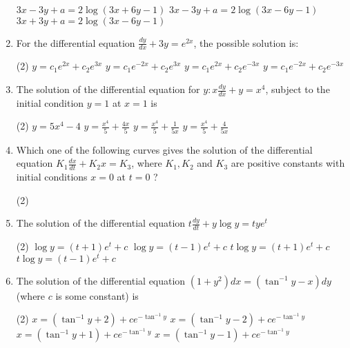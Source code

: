 \begin{enumerate}
\begin{tasks}
		\task[\textbf{b.}] $3 x-3 y+a=2 \log (3 x+6 y-1)$
		\task[\textbf{c.}]$3 x-3 y+a=2 \log (3 x-6 y-1)$
		\task[\textbf{d.}] $3 x+3 y+a=2 \log (3 x-6 y-1)$
	\end{tasks}
	\item For the differential equation $\frac{d y}{d x}+3 y=e^{2 x}$, the possible solution is:
	 \begin{tasks}(2)
		\task[\textbf{a.}]$y=c_{1} e^{2 x}+c_{2} e^{3 x}$
		\task[\textbf{b.}]$y=c_{1} e^{-2 x}+c_{2} e^{3 x}$
		\task[\textbf{c.}]$y=c_{1} e^{2 x}+c_{2} e^{-3 x}$
		\task[\textbf{d.}] $y=c_{1} e^{-2 x}+c_{2} e^{-3 x}$
	\end{tasks}
	\item The solution of the differential equation for $y: x \frac{d y}{d x}+y=x^{4}$, subject to the initial condition $y=1$ at $x=1$ is
	 \begin{tasks}(2)
		\task[\textbf{a.}]$y=5 x^{4}-4$
		\task[\textbf{b.}]$y=\frac{x^{4}}{5}+\frac{4 x}{5}$
		\task[\textbf{c.}] $y=\frac{x^{4}}{5}+\frac{1}{5 x}$
		\task[\textbf{d.}] $y=\frac{x^{4}}{5}+\frac{4}{5 x}$
	\end{tasks}
	\item Which one of the following curves gives the solution of the differential equation $K_{1} \frac{d x}{d t}+K_{2} x=K_{3}$, where $K_{1}, K_{2}$ and $K_{3}$ are positive constants with initial conditions $x=0$ at $t=0$ ?
	 \begin{tasks}(2)
		\task[\textbf{a.}]\color{blue}{Picture}
		\task[\textbf{b.}]\color{blue}{Picture}
		\task[\textbf{c.}]\color{blue}{Picture}
		\task[\textbf{d.}] \color{blue}{Picture}
	\end{tasks}
	\item The solution of the differential equation $t \frac{d y}{d t}+y \log y=t y e^{t}$
	 \begin{tasks}(2)
		\task[\textbf{a.}]$\log y=(t+1) e^{t}+c$
		\task[\textbf{b.}]$\log y=(t-1) e^{t}+c$
		\task[\textbf{c.}]$t \log y=(t+1) e^{t}+c$
		\task[\textbf{d.}] $t \log y=(t-1) e^{t}+c$
	\end{tasks}
	\item The solution of the differential equation
	$\left(1+y^{2}\right) d x=\left(\tan ^{-1} y-x\right) d y$ (where $c$ is some constant) is
	 \begin{tasks}(2)
		\task[\textbf{a.}] $x=\left(\tan ^{-1} y+2\right)+c e^{-\tan ^{-1} y}$
		\task[\textbf{b.}] $x=\left(\tan ^{-1} y-2\right)+c e^{-\tan ^{-1} y}$
		\task[\textbf{c.}] $x=\left(\tan ^{-1} y+1\right)+c e^{-\tan ^{-1} y}$
		\task[\textbf{d.}]  $x=\left(\tan ^{-1} y-1\right)+c e^{-\tan ^{-1}y}$

\end{tasks}
\end{enumerate}

